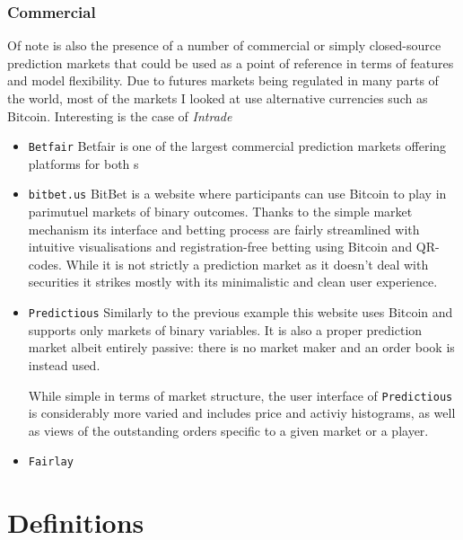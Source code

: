 \documentclass[bsc,frontabs,twoside,singlespacing,parskip,deptreport]{infthesis}     %
\begin{document}

\subsection{ Commercial }
	Of note is also the presence of a number of commercial or simply closed-source prediction markets that could be used as a point of reference in terms of features and model flexibility. Due to futures markets being regulated in many parts of the world, most of the markets I looked at use alternative currencies such as Bitcoin. Interesting is the case of {\em Intrade}
\begin{itemize}

\item {\tt Betfair}
    Betfair is one of the largest commercial prediction markets offering platforms for both s
\item {\tt bitbet.us}
	BitBet is a website where participants can use Bitcoin to play in parimutuel markets of binary outcomes. Thanks to the simple market mechanism its interface and betting process are fairly streamlined with intuitive visualisations and registration-free betting using Bitcoin and QR-codes. While it is not strictly a prediction market as it doesn't deal with securities it strikes mostly with its minimalistic and clean user experience. 

\item {\tt Predictious}
	Similarly to the previous example this website uses Bitcoin and supports only markets of binary variables. It is also a proper prediction market albeit entirely passive: there is no market maker and an order book is instead used. 

	While simple in terms of market structure, the user interface of {\tt Predictious} is considerably more varied and includes price and activiy histograms, as well as views of the outstanding orders specific to a given market or a player. 


\item {\tt Fairlay}	


\end{itemize}
\chapter{Definitions}
\end{document}
